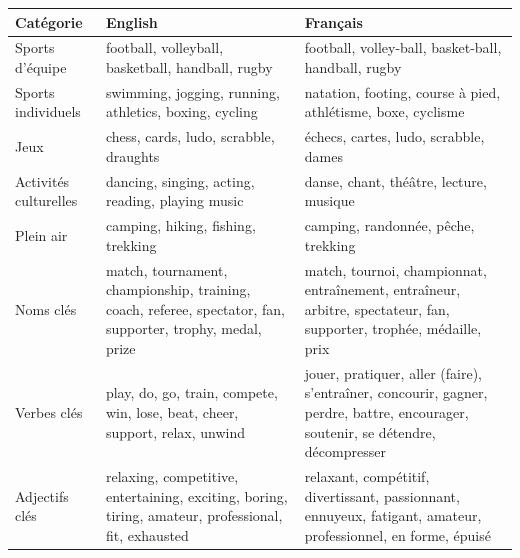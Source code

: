 \documentclass[11pt]{article}
\begin{document}
\begin{exemplebox}
\begin{center}
\begin{tabularx}{\linewidth}{|X|X|X|}
\hline
\rowcolor{popblueL} \textbf{Catégorie} & \textbf{English} & \textbf{Français} \\
\hline
Sports d'équipe & football, volleyball, basketball, handball, rugby & football, volley-ball, basket-ball, handball, rugby \\
\hline
Sports individuels & swimming, jogging, running, athletics, boxing, cycling & natation, footing, course à pied, athlétisme, boxe, cyclisme \\
\hline
Jeux & chess, cards, ludo, scrabble, draughts & échecs, cartes, ludo, scrabble, dames \\
\hline
Activités culturelles & dancing, singing, acting, reading, playing music & danse, chant, théâtre, lecture, musique \\
\hline
Plein air & camping, hiking, fishing, trekking & camping, randonnée, pêche, trekking \\
\hline
Noms clés & match, tournament, championship, training, coach, referee, spectator, fan, supporter, trophy, medal, prize & match, tournoi, championnat, entraînement, entraîneur, arbitre, spectateur, fan, supporter, trophée, médaille, prix \\
\hline
Verbes clés & play, do, go, train, compete, win, lose, beat, cheer, support, relax, unwind & jouer, pratiquer, aller (faire), s'entraîner, concourir, gagner, perdre, battre, encourager, soutenir, se détendre, décompresser \\
\hline
Adjectifs clés & relaxing, competitive, entertaining, exciting, boring, tiring, amateur, professional, fit, exhausted & relaxant, compétitif, divertissant, passionnant, ennuyeux, fatigant, amateur, professionnel, en forme, épuisé \\
\hline
\end{tabularx}
\end{center}
\end{exemplebox}
\end{document}
